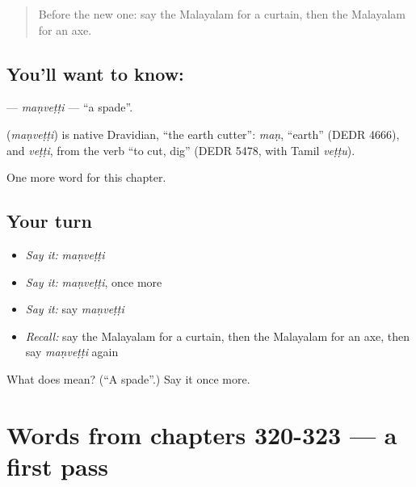 \label{lesson:ML-C328-manvetti}



\begin{quote}
Before the new one: say the Malayalam for a curtain, then the Malayalam for an axe.
\end{quote}

\subsection*{You'll want to know: }
\textbf{} — \emph{maṇveṭṭi} — \textquotedblleft{}a spade\textquotedblright{}.

\begin{cousinweb}
\textbf{} (\emph{maṇveṭṭi}) is native Dravidian, \textquotedblleft{}the earth cutter\textquotedblright{}: \emph{maṇ}, \textquotedblleft{}earth\textquotedblright{} (DEDR 4666), and \emph{veṭṭi}, from the verb \textquotedblleft{}to cut, dig\textquotedblright{} (DEDR 5478, with Tamil \emph{veṭṭu}).
\end{cousinweb}

\begin{grammarlens}[title={What you've built}]
One more word for this chapter.
\end{grammarlens}

\subsection*{Your turn}
\begin{itemize}
\raggedright
  \item \emph{Say it:} \emph{maṇveṭṭi}
  \item \emph{Say it:} \emph{maṇveṭṭi}, once more
  \item \emph{Say it:} say \emph{maṇveṭṭi}
  \item \emph{Recall:} say the Malayalam for a curtain, then the Malayalam for an axe, then say \emph{maṇveṭṭi} again
\end{itemize}

\begin{tcolorbox}[breakable,colback=teal!4,colframe=teal!35!black,title={Before you move on}]
What does  mean? (\textquotedblleft{}A spade\textquotedblright{}.) Say it once more.
\end{tcolorbox}
\section[(dialogue)]{Words from chapters 320-323 — a first pass}

